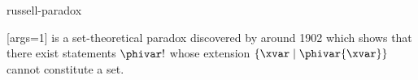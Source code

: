 \documentclass{stex}
\begin{document}
\begin{smodule}{russell-paradox}
\begin{sparagraph}[style=symdoc]
  [args=1]{\maincomp{\varphi}}
   is a set-theoretical paradox discovered by  around 1902 which shows that there exist statements $\phivar!$ whose extension $\{\xvar\mid\phivar{\xvar}\}$ cannot constitute a set.
\end{sparagraph}
\end{smodule}
\end{document}
